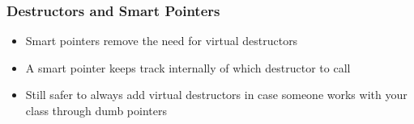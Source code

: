 \begin{frame}
  \frametitle{Destructors and Smart Pointers}
  \begin{itemize}
    \item Smart pointers remove the need for virtual destructors
    \item A smart pointer keeps track internally of which destructor to call
    \item Still safer to always add virtual destructors in case someone works with your class through dumb pointers
  \end{itemize}
\end{frame}




